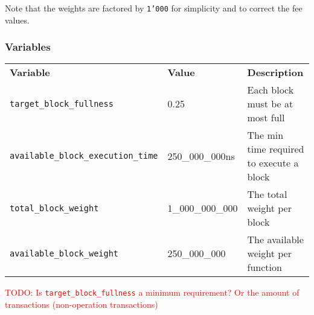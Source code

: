 \documentclass[11pt,a4paper]{article}
\newcommand{\todo}[1]{\textcolor{red}{TODO: #1}}
\begin{document}
Note that the weights are factored by \texttt{1'000} for simplicity and to correct
the fee values.

\subsubsection*{Variables}

\begin{center}
  \begin{tabulary}{1.0\textwidth}{LLL}
    \textbf{Variable} & \textbf{Value} & \textbf{Description} \\
    \texttt{target\_block\_fullness} & 0.25 & Each block must be at most full \\
    \texttt{available\_block\_execution\_time} & 250\_000\_000ns & The min time required to execute a block \\
    \texttt{total\_block\_weight} & 1\_000\_000\_000 & The total weight per block \\
    \texttt{available\_block\_weight} & 250\_000\_000 & The available weight per function \\
    \hline
  \end{tabulary}
\end{center}

\todo{Is \texttt{target\_block\_fullness} a minimum requirement? Or the amount of transactions (non-operation transactions)}
\end{document}
